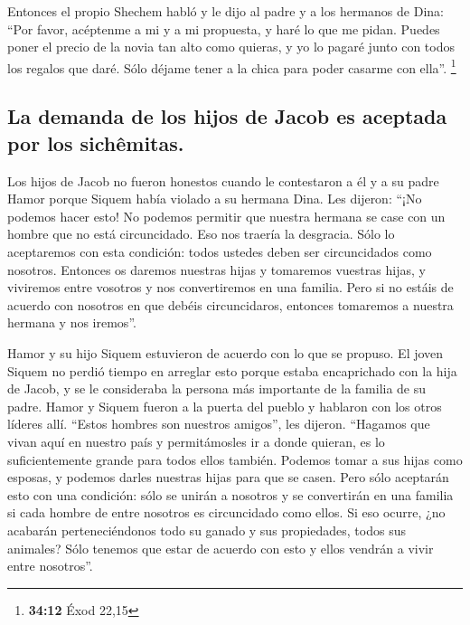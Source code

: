  Entonces el propio Shechem habló y le dijo al padre y a
los hermanos de Dina: ``Por favor, acéptenme a mi y a mi propuesta, y
haré lo que me pidan.  Puedes poner el precio de la novia
tan alto como quieras, y yo lo pagaré junto con todos los regalos que
daré. Sólo déjame tener a la chica para poder casarme con ella''.
\footnote{\textbf{34:12} Éxod 22,15}

\hypertarget{la-demanda-de-los-hijos-de-jacob-es-aceptada-por-los-sichuxeamitas.}{%
\subsection{La demanda de los hijos de Jacob es aceptada por los
sichêmitas.}\label{la-demanda-de-los-hijos-de-jacob-es-aceptada-por-los-sichuxeamitas.}}

 Los hijos de Jacob no fueron honestos cuando le
contestaron a él y a su padre Hamor porque Siquem había violado a su
hermana Dina.  Les dijeron: ``¡No podemos hacer esto! No
podemos permitir que nuestra hermana se case con un hombre que no está
circuncidado. Eso nos traería la desgracia.  Sólo lo
aceptaremos con esta condición: todos ustedes deben ser circuncidados
como nosotros.  Entonces os daremos nuestras hijas y
tomaremos vuestras hijas, y viviremos entre vosotros y nos convertiremos
en una familia.  Pero si no estáis de acuerdo con
nosotros en que debéis circuncidaros, entonces tomaremos a nuestra
hermana y nos iremos''.

 Hamor y su hijo Siquem estuvieron de acuerdo con lo que
se propuso.  El joven Siquem no perdió tiempo en arreglar
esto porque estaba encaprichado con la hija de Jacob, y se le
consideraba la persona más importante de la familia de su padre.
 Hamor y Siquem fueron a la puerta del pueblo y hablaron
con los otros líderes allí.  ``Estos hombres son nuestros
amigos'', les dijeron. ``Hagamos que vivan aquí en nuestro país y
permitámosles ir a donde quieran, es lo suficientemente grande para
todos ellos también. Podemos tomar a sus hijas como esposas, y podemos
darles nuestras hijas para que se casen.  Pero sólo
aceptarán esto con una condición: sólo se unirán a nosotros y se
convertirán en una familia si cada hombre de entre nosotros es
circuncidado como ellos.  Si eso ocurre, ¿no acabarán
perteneciéndonos todo su ganado y sus propiedades, todos sus animales?
Sólo tenemos que estar de acuerdo con esto y ellos vendrán a vivir entre
nosotros''.

